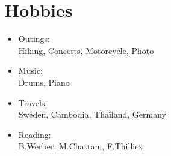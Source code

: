 \documentclass[]{friggeri-cv}
\begin{document}
\section{Hobbies}
\vspace*{-0.45cm}
\setlength{\columnsep}{-2cm}
\begin{multicols}{2}
\begin{itemize}
\setlength{\itemsep}{1pt}
\setlength{\parskip}{0pt}
\setlength{\parsep}{0pt}
\item Outings: \\
Hiking, Concerts,  Motorcycle, Photo\\
\item Music: \\
Drums, Piano\\
\columnbreak
\item Travels: \\
Sweden, Cambodia, Thaïland, Germany\\
\item Reading: \\
B.Werber, M.Chattam, F.Thilliez
\end{itemize}
\end{multicols}
\end{document}
